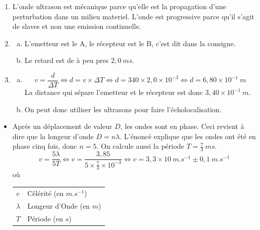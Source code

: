 \documentclass[12pt, a4paper]{article}
\makeatletter
\newenvironment{conditions}
  {\par\vspace{\abovedisplayskip}\noindent\begin{tabular}{>{$}l<{$} @{${\quad}={\quad}$} l}}
  {\end{tabular}\par\vspace{\belowdisplayskip}}
\makeatother
\begin{document}
    \begin{Exercise}[number={27}]
        \begin{enumerate}[1.]
            \item L'onde ultrason est mécanique parce qu'elle est la propagation d'une perturbation dans un milieu materiel. L'onde est progressive parce qu'il s'agit de slaves et non une emission continuelle.
            \item   \begin{enumerate}[a.]
                        \item L'emetteur est le {A}, le récepteur est le {B}, c'est dit dans la consigne.
                        \item Le retard est de à peu pres $2{,}0\ \si{ms}$.
                    \end{enumerate}
            \item   \begin{enumerate}[a.]
                        \item   \begin{equation*}
                                    v=\frac{d}{\Delta T}
                                    \iff d=v\times\Delta T
                                    \iff d=340\times 2{,}0\times 10^{-3}
                                    \iff d=6{,}80\times 10^{-1}\ \si{m}
                                \end{equation*}
                                La distance qui sépare l'emetteur et le récepteur est donc $3{,}40\times 10^{-1}\ \si{m}$.
                        \item On peut donc utiliser les ultrasons pour faire l'écholocalisation.
                    \end{enumerate}
        \end{enumerate}
    \end{Exercise}

    \begin{Exercise}[number={28}]
        \begin{itemize}
            \item[] Aprés un déplacement de valeur $D$, les ondes sont en phase. Ceci revient à dire que la longeur d'onde $D=n\lambda$. L'énoncé explique que les ondes ont été en phase cinq fois, donc $n=5$. On calcule aussi la période $T=\frac{7}{3}\ \si{ms}$.
            \begin{equation*}
                v=\frac{5\lambda}{5T}
                \iff v=\frac{3{,}85}{5\times\frac{7}{3}\times 10^{-3}}
                \iff v=3{,}3\times 10\ \si{m.s^{-1}} \pm 0{,}1\ \si{m.s^{-1}}
            \end{equation*} où
            \begin{conditions}
                v & Célérité (en $\si{m.s^{-1}}$) \\ 
                \lambda & Longeur d'Onde (en $\si{m}$) \\
                T & Période (en $\si{s}$) 
            \end{conditions}
        \end{itemize}
    \end{Exercise}
\end{document}
